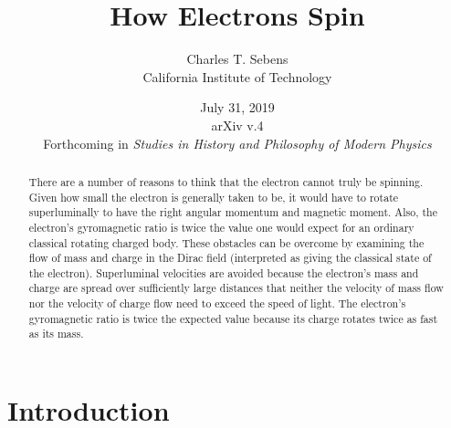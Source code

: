 \documentclass[onecolumn,secnumarabic,amsmath,amssymb,balancelastpage,nofootinbib]{article}
\begin{document}
\sloppy %




\title{\vspace*{-35 pt}\Huge{How Electrons Spin}}
\author{Charles T. Sebens\\California Institute of Technology}
\date{July 31, 2019\\arXiv v.4\\\vspace{10 pt}Forthcoming in \emph{Studies in History and Philosophy of Modern Physics}}


\maketitle
\begin{abstract}

There are a number of reasons to think that the electron cannot truly be spinning.  Given how small the electron is generally taken to be, it would have to rotate superluminally to have the right angular momentum and magnetic moment.  Also, the electron's gyromagnetic ratio is twice the value one would expect for an ordinary classical rotating charged body.  These obstacles can be overcome by examining the flow of mass and charge in the Dirac field (interpreted as giving the classical state of the electron).  Superluminal velocities are avoided because the electron's mass and charge are spread over sufficiently large distances that neither the velocity of mass flow nor the velocity of charge flow need to exceed the speed of light.  The electron's gyromagnetic ratio is twice the expected value because its charge rotates twice as fast as its mass.

\end{abstract}
\vspace*{12 pt}
\tableofcontents
\newpage

\section{Introduction}
\end{document}
